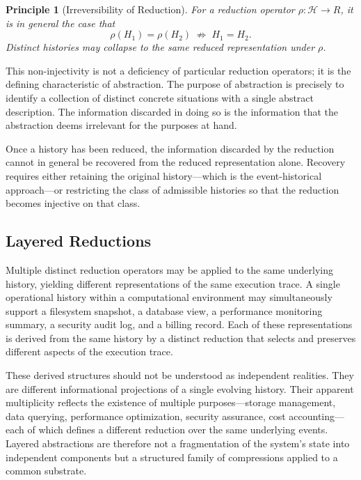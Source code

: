 \documentclass[12pt]{article}
\newtheorem{principle}{Principle}
\begin{document}
\begin{principle}[Irreversibility of Reduction]
For a reduction operator $\rho : \mathcal{H} \rightarrow R$, it is in general the case that
\[
\rho(H_1) = \rho(H_2) \;\not\Rightarrow\; H_1 = H_2.
\]
Distinct histories may collapse to the same reduced representation under $\rho$.
\end{principle}

This non-injectivity is not a deficiency of particular reduction operators; it is the defining characteristic of abstraction. The purpose of abstraction is precisely to identify a collection of distinct concrete situations with a single abstract description. The information discarded in doing so is the information that the abstraction deems irrelevant for the purposes at hand.

Once a history has been reduced, the information discarded by the reduction cannot in general be recovered from the reduced representation alone. Recovery requires either retaining the original history---which is the event-historical approach---or restricting the class of admissible histories so that the reduction becomes injective on that class.

\subsection{Layered Reductions}

Multiple distinct reduction operators may be applied to the same underlying history, yielding different representations of the same execution trace. A single operational history within a computational environment may simultaneously support a filesystem snapshot, a database view, a performance monitoring summary, a security audit log, and a billing record. Each of these representations is derived from the same history by a distinct reduction that selects and preserves different aspects of the execution trace.

These derived structures should not be understood as independent realities. They are different informational projections of a single evolving history. Their apparent multiplicity reflects the existence of multiple purposes---storage management, data querying, performance optimization, security assurance, cost accounting---each of which defines a different reduction over the same underlying events. Layered abstractions are therefore not a fragmentation of the system's state into independent components but a structured family of compressions applied to a common substrate.
\end{document}
